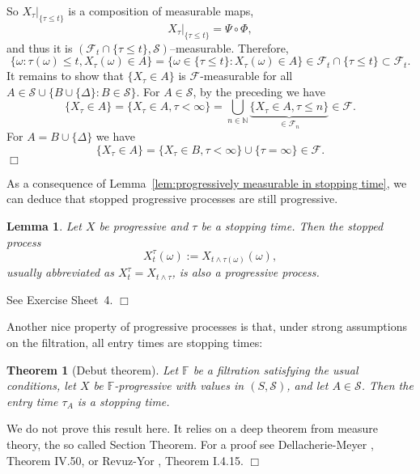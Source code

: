 \documentclass{article}
\newcommand{\coloneq}{:=}
\newcommand{\emph}[1]{{\em #1\/}}
\newcommand{\textbf}[1]{\text{{\bfseries{#1}}}}
\newenvironment{proof}{\noindent\textbf{Proof\ }}{\hspace*{\fill}$\Box$\medskip}
\newtheorem{lemma}{Lemma}
\newtheorem{theorem}{Theorem}
\newcommand{\1}{\1}
\begin{document}
{\begin{proof}
  So $X_{\tau} |_{\{\tau \leqslant t\}}$ is a composition of measurable maps,
  \[ X_{\tau} |_{\{\tau \leqslant t\}} = \Psi \circ \Phi, \]
  and thus it is $(\mathcal{F}_t \cap \{\tau \leqslant t\},
  \mathcal{S})$--measurable. Therefore,
  \[ \{\omega : \tau (\omega) \leqslant t, X_{\tau} (\omega) \in A\} =
     \{\omega \in \{\tau \leqslant t\}: X_{\tau} (\omega) \in A\} \in
     \mathcal{F}_t \cap \{\tau \leqslant t\} \subset \mathcal{F}_t . \]
  It remains to show that $\{ X_{\tau} \in A \}$ is $\mathcal{F}$-measurable
  for all $A \in \mathcal{S} \cup \{ B \cup \{ \Delta \} : B \in \mathcal{S}
  \}$. For $A \in \mathcal{S}$, by the preceding we have
  \[ \{ X_{\tau} \in A \} = \{ X_{\tau} \in A, \tau < \infty \} = \bigcup_{n
     \in \mathbb{N}} \underbrace{\{ X_{\tau} \in A, \tau \leqslant n \}}_{\in
     \mathcal{F}_n} \in \mathcal{F}. \]
  For $A = B \cup \{ \Delta \}$ we have
  \[ \{ X_{\tau} \in A \} = \{ X_{\tau} \in B, \tau < \infty \} \cup \{ \tau =
     \infty \} \in \mathcal{F}. \]
\end{proof}

As a consequence of Lemma~\ref{lem:progressively measurable in stopping time},
we can deduce that stopped progressive processes are still
progressive.

\begin{lemma}
  Let $X$ be progressive and $\tau$ be a stopping time. Then the
  {\emph{stopped process}}
  \[ X^{\tau}_t (\omega) \coloneq X_{t \wedge \tau (\omega)} (\omega), \]
  usually abbreviated as $X^{\tau}_t = X_{t \wedge \tau}$, is also a
  progressive process.
\end{lemma}

\begin{proof}
  See Exercise Sheet~4.
\end{proof}

Another nice property of progressive processes is that, under strong
assumptions on the filtration, all entry times are stopping times:

\begin{theorem}[Debut theorem]
  \label{thm:Debut theorem}Let $\mathbb{F}$ be a filtration satisfying the
  usual conditions, let $X$ be $\mathbb{F}$-progressive with values in $(S,
  \mathcal{S})$, and let $A \in \mathcal{S}$. Then the entry time $\tau_A$ is
  a stopping time.
\end{theorem}

\begin{proof}
  We do not prove this result here. It relies on a deep theorem from measure
  theory, the so called Section Theorem. For a proof see
  Dellacherie-Meyer {\cite{Dellacherie1978}}, Theorem IV.50, or Revuz-Yor
  {\cite{Revuz1999}}, Theorem I.4.15.
\end{proof}

}
\end{document}
